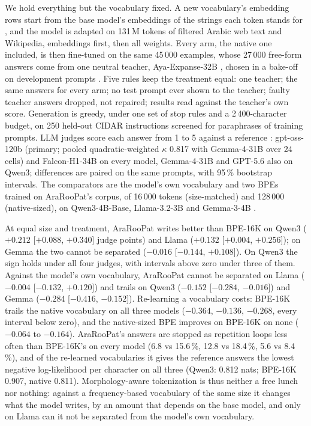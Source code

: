 We hold everything but the vocabulary fixed. A new vocabulary's embedding rows start from the base model's embeddings
of the strings each token stands for \citep{minixhofer-etal-2022-wechsel,dobler-de-melo-2023-focus,mundra2024empirical},
and the model is adapted on 131\,M tokens of filtered Arabic web text and Wikipedia, embeddings first, then all
weights. Every arm, the native one included, is then fine-tuned on the same 45\,000 examples, whose 27\,000 free-form
answers come from one neutral teacher, Aya-Expanse-32B \citep{dang2024ayaexpanse}, chosen in a bake-off on development
prompts \citep[sequence-level distillation;][]{kim-rush-2016-sequence}. Five rules keep the treatment equal: one
teacher; the same answers for every arm; no test prompt ever shown to the teacher; faulty teacher answers dropped, not
repaired; results read against the teacher's own score. Generation is greedy, under one set of stop rules and a
2\,400-character budget, on 250 held-out CIDAR instructions \citep{alyafeai2024cidar} screened for paraphrases of
training prompts. LLM judges score each answer from 1 to 5 against a reference \citep{zheng2023judging}: gpt-oss-120b
(primary; pooled quadratic-weighted $\kappa$ 0.817 with Gemma-4-31B over 24 cells) and Falcon-H1-34B on every model,
Gemma-4-31B and GPT-5.6 also on Qwen3; differences are paired on the same prompts, with 95\,\% bootstrap intervals.
The comparators are the model's own vocabulary and two BPEs trained on AraRooPat's corpus, of 16\,000 tokens
(size-matched) and 128\,000 (native-sized), on Qwen3-4B-Base, Llama-3.2-3B and Gemma-3-4B
\citep{yang2025qwen3,grattafiori2024llama3,gemmateam2025gemma3}.

At equal size and treatment, AraRooPat writes better than BPE-16K on Qwen3 ($+0.212$ [$+0.088$, $+0.340$] judge points)
and Llama ($+0.132$ [$+0.004$, $+0.256$]); on Gemma the two cannot be separated ($-0.016$ [$-0.144$, $+0.108$]). On
Qwen3 the sign holds under all four judges, with intervals above zero under three of them. Against the model's own
vocabulary, AraRooPat cannot be separated on Llama ($-0.004$ [$-0.132$, $+0.120$]) and trails on Qwen3 ($-0.152$
[$-0.284$, $-0.016$]) and Gemma ($-0.284$ [$-0.416$, $-0.152$]). Re-learning a vocabulary costs: BPE-16K trails the
native vocabulary on all three models ($-0.364$, $-0.136$, $-0.268$, every interval below zero), and the native-sized
BPE improves on BPE-16K on none ($-0.064$ to $-0.164$). AraRooPat's answers are stopped as repetition loops
\citep{holtzman2020curious,xu2022learning} less often than BPE-16K's on every model (6.8 vs 15.6\,\%, 12.8 vs
18.4\,\%, 5.6 vs 8.4\,\%), and of the re-learned vocabularies it gives the reference answers the lowest negative
log-likelihood per character on all three (Qwen3: 0.812 nats; BPE-16K 0.907, native 0.811). Morphology-aware
tokenization is thus neither a free lunch nor nothing: against a frequency-based vocabulary of the same size it changes
what the model writes, by an amount that depends on the base model, and only on Llama can it not be separated from the
model's own vocabulary.

